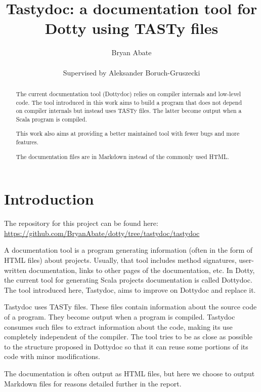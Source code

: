 \documentclass{report}
\begin{document}
\title{Tastydoc: a documentation tool for Dotty using TASTy files}
\author{Bryan Abate
\\\\\small{Supervised by Aleksander Boruch-Gruszecki}}

\maketitle

\begin{abstract}
The current documentation tool (Dottydoc) relies on compiler internals and low-level code. The tool introduced in this work aims to build a program that does not depend on compiler internals but instead uses TASTy files. The latter become output when a Scala program is compiled.

This work also aims at providing a better maintained tool with fewer bugs and more features.

The documentation files are in Markdown instead of the commonly used HTML.
\end{abstract}

\tableofcontents

\chapter{Introduction}

The repository for this project can be found here: \url{https://github.com/BryanAbate/dotty/tree/tastydoc/tastydoc}

A documentation tool is a program generating information (often in the form of HTML files) about projects. Usually, that tool includes method signatures, user-written documentation, links to other pages of the documentation, etc.
In Dotty, the current tool for generating Scala projects documentation is called Dottydoc. The tool introduced here, Tastydoc, aims to improve on Dottydoc and replace it.

Tastydoc uses TASTy files. These files contain information about the source code of a program. They become output when a program is compiled. Tastydoc consumes such files to extract information about the code, making its use completely independent of the compiler.
The tool tries to be as close as possible to the structure proposed in Dottydoc so that it can reuse some portions of its code with minor modifications.

The documentation is often output as HTML files, but here we choose to output Markdown files for reasons detailed further in the report.
\end{document}
